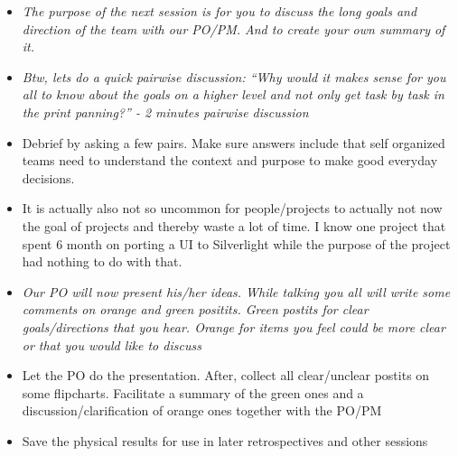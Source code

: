 \documentclass[a4paper,,tablecaptionabove]{scrartcl}
\begin{document}
\begin{itemize}
\item
  \emph{The purpose of the next session is for you to discuss the long
  goals and direction of the team with our PO/PM. And to create your own
  summary of it.}
\item
  \emph{Btw, lets do a quick pairwise discussion: \enquote{Why would it
  makes sense for you all to know about the goals on a higher level and
  not only get task by task in the print panning?} - 2 minutes pairwise
  discussion}
\item
  Debrief by asking a few pairs. Make sure answers include that self
  organized teams need to understand the context and purpose to make
  good everyday decisions.
\item
  It is actually also not so uncommon for people/projects to actually
  not now the goal of projects and thereby waste a lot of time. I know
  one project that spent 6 month on porting a UI to Silverlight while
  the purpose of the project had nothing to do with that.
\item
  \emph{Our PO will now present his/her ideas. While talking you all
  will write some comments on orange and green positits. Green postits
  for clear goals/directions that you hear. Orange for items you feel
  could be more clear or that you would like to discuss}
\item
  Let the PO do the presentation. After, collect all clear/unclear
  postits on some flipcharts. Facilitate a summary of the green ones and
  a discussion/clarification of orange ones together with the PO/PM
\item
  Save the physical results for use in later retrospectives and other
  sessions
\end{itemize}
\end{document}
